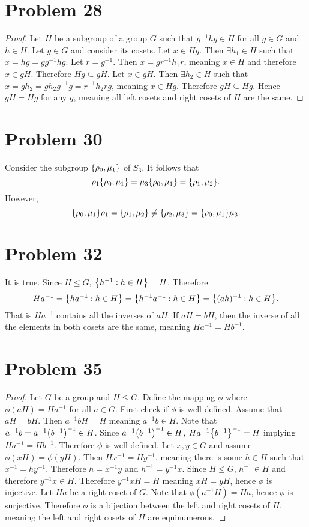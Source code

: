 \documentclass[12pt]{extarticle}
\begin{document}
\section*{Problem 28}
\begin{proof}
	Let $H$ be a subgroup of a group $G$ such that $g^{-1} h g \in H$ for all $g \in G$ and $h \in H$. Let $g \in G$ and consider its cosets. Let $x \in Hg$. Then $\exists h_1 \in H$ such that $x = hg = g g^{-1} h g$. Let $r = g^{-1}$. Then $x = g r^{-1} h_1 r$, meaning $x \in H$ and therefore $x \in gH$. Therefore $Hg \subseteq gH$. Let $x \in gH$. Then $\exists h_2 \in H$ such that $x = g h_2 = g h_2 g^{-1} g = r^{-1} h_2 r g$, meaning $x \in Hg$. Therefore $gH \subseteq Hg$. Hence $gH = Hg$ for any $g$, meaning all left cosets and right cosets of $H$ are the same.
\end{proof}

\section*{Problem 30}
Consider the subgroup $\qty{\rho_0, \mu_1}$ of $S_3$. It follows that
\[
	\rho_1 \qty{\rho_0, \mu_1} = \mu_3 \qty{\rho_0, \mu_1} = \qty{\rho_1, \mu_2}
.\]
However,
\[
	\qty{\rho_0, \mu_1}\rho_1 = \qty{\rho_1, \mu_2} \neq \qty{\rho_2, \mu_3} = \qty{\rho_0, \mu_1} \mu_3
.\]

\section*{Problem 32}
It is true. Since $H \leq G$, $\qty{h^{-1} : h \in H} = H$. Therefore 
\[
	Ha^{-1} = \qty{ha^{-1} : h \in H} = \qty{h^{-1} a^{-1} : h \in H} = \qty{(ah)^{-1} : h \in H}
.\]
That is $Ha^{-1}$ contains all the inverses of $aH$. If $aH = bH$, then the inverse of all the elements in both cosets are the same, meaning $Ha^{-1} = Hb^{-1}$.

\section*{Problem 35}
\begin{proof}
	Let $G$ be a group and $H \leq G$. Define the mapping $\phi$ where $\phi(aH) = Ha^{-1}$ for all $a \in G$. First check if $\phi$ is well defined. Assume that $aH = bH$. Then $a^{-1} b H = H$ meaning $a^{-1} b \in H$. Note that $a^{-1} b = a^{-1} \qty(b^{-1})^{-1} \in H$. Since $a^{-1} \qty(b^{-1})^{-1} \in H$, $H a^{-1} \qty{b^{-1}}^{-1} = H$ implying $Ha^{-1} = Hb^{-1}$. Therefore $\phi$ is well defined. Let $x,y \in G$ and assume $\phi(xH) = \phi(yH)$. Then $Hx^{-1} = Hy^{-1}$, meaning there is some $h \in H$ such that $x^{-1} = hy^{-1}$. Therefore $h = x^{-1} y$ and $h^{-1} = y^{-1} x$. Since $H \leq G$, $h^{-1} \in H$ and therefore $y^{-1} x \in H$. Therefore $y^{-1} x H = H$ meaning $xH = yH$, hence $\phi$ is injective. Let $Ha$ be a right coset of $G$. Note that $\phi(a^{-1} H) = Ha$, hence $\phi$ is surjective. Therefore $\phi$ is a bijection between the left and right cosets of $H$, meaning the left and right cosets of $H$ are equinumerous.
\end{proof}
\end{document}
